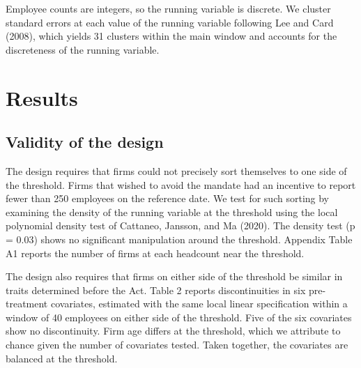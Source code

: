 \documentclass[12pt]{article}
\begin{document}
Employee counts are integers, so the running variable is discrete. We cluster standard errors at each value of the running variable following Lee and Card (2008), which yields 31 clusters within the main window and accounts for the discreteness of the running variable.

\section{Results}

\subsection{Validity of the design}

The design requires that firms could not precisely sort themselves to one side of the threshold. Firms that wished to avoid the mandate had an incentive to report fewer than 250 employees on the reference date. We test for such sorting by examining the density of the running variable at the threshold using the local polynomial density test of Cattaneo, Jansson, and Ma (2020). The density test (p = 0.03) shows no significant manipulation around the threshold. Appendix Table A1 reports the number of firms at each headcount near the threshold.

The design also requires that firms on either side of the threshold be similar in traits determined before the Act. Table 2 reports discontinuities in six pre-treatment covariates, estimated with the same local linear specification within a window of 40 employees on either side of the threshold. Five of the six covariates show no discontinuity. Firm age differs at the threshold, which we attribute to chance given the number of covariates tested. Taken together, the covariates are balanced at the threshold.
\end{document}
